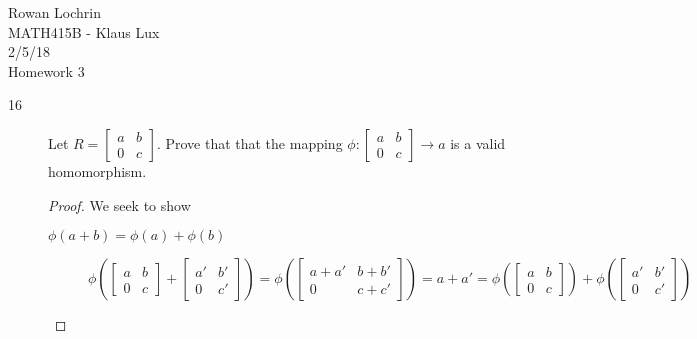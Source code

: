 \documentclass[11pt]{article}
\begin{document}
\begin{flushleft}
	Rowan Lochrin \\
	MATH415B - Klaus Lux \\
	2/5/18 \\
	Homework 3
\end{flushleft}
\begin{description}
	\item[16]
	Let $R = \begin{bmatrix} a & b \\ 0 & c \end{bmatrix}$. Prove that
	that the mapping  $\phi: \begin{bmatrix} a & b \\ 0 & c \end{bmatrix} \rightarrow a$ is a valid homomorphism.
	\begin{proof}
		We seek to show
	\begin{description}
		\item[$\phi(a + b) = \phi(a) + \phi(b)$]
		$$ \phi(\begin{bmatrix} a & b \\ 0 & c \end{bmatrix} +
			\begin{bmatrix} a' & b' \\ 0 & c' \end{bmatrix})
		= \phi(\begin{bmatrix} a + a' & b + b' \\ 0 & c + c' \end{bmatrix}) 
		= a + a'
		= \phi(\begin{bmatrix} a & b \\ 0 & c \end{bmatrix}) +
			\phi(\begin{bmatrix} a' & b' \\ 0 & c' \end{bmatrix}) $$
		

\end{description}
\end{proof}
\end{description}
\end{document}

